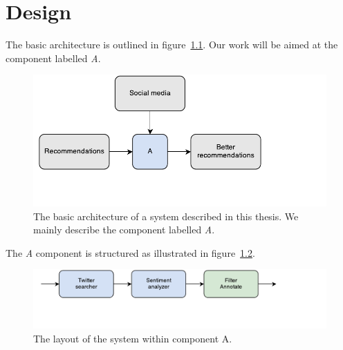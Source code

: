 
\chapter{Design} %

\label{Chapter4} %



% 
% 

The basic architecture is outlined in figure~\ref{fig:1_basic_architecture}. Our work will be aimed at the component labelled \emph{A}.

\begin{figure}[h]
  \centering
    \includegraphics{Figures/01-high-level-architecture}
  \caption{The basic architecture of a system described in this thesis. We mainly describe the component labelled \emph{A}.}
  \label{fig:1_basic_architecture}
\end{figure}

The \emph{A} component is structured as illustrated in figure~\ref{fig:2_component_architecture}.

\begin{figure}[h]
  \centering
    \includegraphics{Figures/02-component-layout}
  \caption{The layout of the system within component A.}
  \label{fig:2_component_architecture}
\end{figure}

